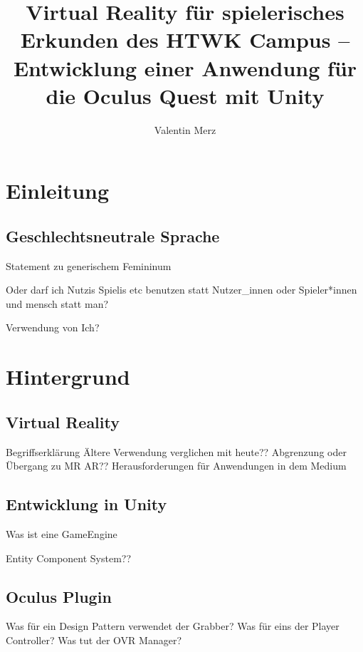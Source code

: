 \documentclass[11pt]{article} %
\title{Virtual Reality für spielerisches Erkunden des HTWK Campus – Entwicklung einer Anwendung für die Oculus Quest mit Unity}
\author{Valentin Merz}
\begin{document}
\maketitle

\clearpage


\tableofcontents

\clearpage



\section{Einleitung}

\subsection{Geschlechtsneutrale Sprache}

Statement zu generischem Femininum

Oder darf ich Nutzis Spielis etc benutzen statt Nutzer_innen oder Spieler*innen und mensch statt man?

Verwendung von Ich?

\section{Hintergrund}

\subsection{Virtual Reality}

Begriffserklärung
Ältere Verwendung verglichen mit heute??
Abgrenzung oder Übergang zu MR AR??
Herausforderungen für Anwendungen in dem Medium

\subsection{Entwicklung in Unity}

Was ist eine GameEngine

Entity Component System??

\subsection{Oculus Plugin}

Was für ein Design Pattern verwendet der Grabber?
Was für eins der Player Controller?
Was tut der OVR Manager?
\end{document}
